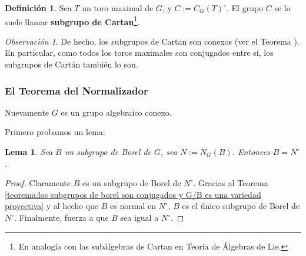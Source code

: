 \documentclass[spanish,10pt]{amsart}
\newtheorem{lemma}[theorem]{Lema}
\theoremstyle{definition}
\newtheorem{definition}[theorem]{Definición}
\theoremstyle{remark}
\newtheorem{remark}[theorem]{Observación}
\numberwithin{equation}{section}
\begin{document}
\begin{definition}
Sea $T$ un toro maximal de $G$, y $C := C_G (T)^\circ$. El grupo $C$ se lo suele llamar \textbf{subgrupo de Cartan}\footnote{En analogía con las subálgebras de Cartan en Teoría de Álgebras de Lie.}.
\end{definition}

\begin{remark}
De hecho, los subgrupos de Cartan son conexos (ver el Teorema \cite[\S 22.3.]{humphreys2012linearAlgebraicGroups}). En particular, como todos los toros maximales son conjugados entre sí, los subgrupos de Cartán también lo son.
\end{remark}


\subsubsection{El Teorema del Normalizador}
Nuevamente $G$ es un grupo algebraico conexo.

Primero probamos un lema:

\begin{lemma}
Sea $B$ un subgrupo de Borel de $G$, sea $N:= N_G(B)$. Entonces $B = N^\circ$.
\end{lemma}
\begin{proof}
Claramente $B$ es un subgrupo de Borel de $N^\circ$. Gracias al Teorema \ref{teorema:los subgrupos de borel son conjugados y G/B es una variedad proyectiva} y al hecho que $B$ es normal en $N^\circ$, $B$ es el único subgrupo de Borel de $N^\circ$. Finalmente, \cite[Teorema de Densidad \S 22.2.]{humphreys2012linearAlgebraicGroups} fuerza a que $B$ sea igual a $N^\circ$.
\end{proof}
\end{document}
